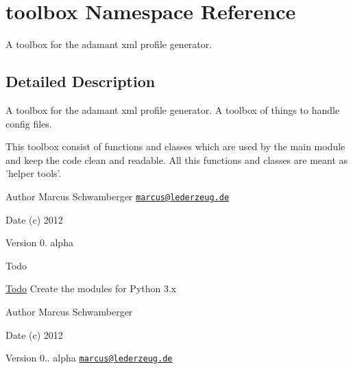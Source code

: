 \hypertarget{namespacetoolbox}{\section{toolbox Namespace Reference}
\label{namespacetoolbox}
}


A toolbox for the adamant xml profile generator.  




\subsection{Detailed Description}
A toolbox for the adamant xml profile generator. A toolbox of things to handle config files.

This toolbox consist of functions and classes which are used by the main module and keep the code clean and readable. All this functions and classes are meant as 'helper tools'.

\begin{DoxyAuthor}{Author}
Marcus Schwamberger  \href{mailto:marcus@lederzeug.de}{\tt marcus@lederzeug.\-de} 
\end{DoxyAuthor}
\begin{DoxyDate}{Date}
(c) 2012 
\end{DoxyDate}
\begin{DoxyVersion}{Version}
0. alpha
\end{DoxyVersion}
\begin{DoxyRefDesc}{Todo}
\item[\hyperlink{todo__todo000028}{Todo}]Create the modules for Python 3.\-x \end{DoxyRefDesc}


\begin{DoxyAuthor}{Author}
Marcus Schwamberger 
\end{DoxyAuthor}
\begin{DoxyDate}{Date}
(c) 2012 
\end{DoxyDate}
\begin{DoxyVersion}{Version}
0.. alpha  \href{mailto:marcus@lederzeug.de}{\tt marcus@lederzeug.\-de} 
\end{DoxyVersion}
